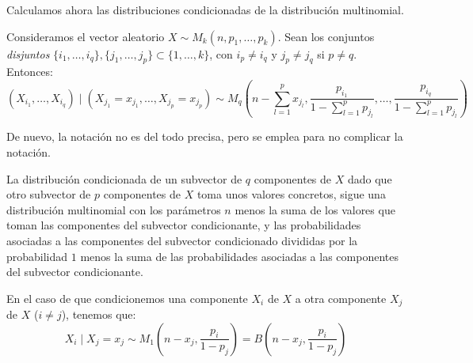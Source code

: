 Calculamos ahora las distribuciones condicionadas de la distribución multinomial.
\begin{prop}
    Consideramos el vector aleatorio $X\sim M_k(n, p_1, \ldots, p_k)$. Sean los conjuntos \emph{disjuntos} $\{i_1, \ldots, i_q\}, \{j_1, \ldots, j_p\}\subset \{1, \ldots, k\}$, con $i_p\neq i_q$ y $j_p\neq j_q$ si $p\neq q$. Entonces:
    \begin{equation*}
        (X_{i_1}, \ldots, X_{i_q})\mid (X_{j_1}=x_{j_1}, \ldots, X_{j_p}=x_{j_p})\sim M_q\left(n-\sum_{l=1}^p x_{j_l}, \dfrac{p_{i_1}}{1-\sum\limits_{l=1}^p p_{j_l}}, \ldots, \dfrac{p_{i_q}}{1-\sum\limits_{l=1}^p p_{j_l}}\right)
    \end{equation*}
\end{prop}
\begin{observacion}
    De nuevo, la notación no es del todo precisa, pero se emplea para no complicar la notación.

    La distribución condicionada de un subvector de $q$ componentes de $X$ dado que otro subvector de $p$ componentes de $X$ toma unos valores concretos, sigue una distribución multinomial con los parámetros $n$ menos la suma de los valores que toman las componentes del subvector condicionante, y las probabilidades asociadas a las componentes del subvector condicionado divididas por la probabilidad $1$ menos la suma de las probabilidades asociadas a las componentes del subvector condicionante.
\end{observacion}

En el caso de que condicionemos una componente $X_i$ de $X$ a otra componente $X_j$ de $X$ ($i\neq j$), tenemos que:
\begin{equation*}
    X_i \mid X_j=x_j\sim M_1 \left(n-x_j, \dfrac{p_i}{1-p_j}\right) = B\left(n-x_j, \dfrac{p_i}{1-p_j}\right)
\end{equation*}

